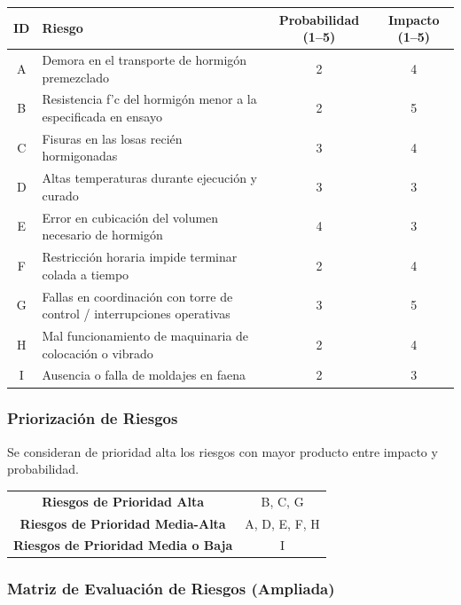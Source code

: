 \begin{center}
\begin{tabular}{|c|p{8.2cm}|c|c|}
\hline
\textbf{ID} & \textbf{Riesgo} & \textbf{Probabilidad (1–5)} & \textbf{Impacto (1–5)} \\
\hline
A & Demora en el transporte de hormigón premezclado & 2 & 4 \\
B & Resistencia f’c del hormigón menor a la especificada en ensayo & 2 & 5 \\
C & Fisuras en las losas recién hormigonadas & 3 & 4 \\
D & Altas temperaturas durante ejecución y curado & 3 & 3 \\
E & Error en cubicación del volumen necesario de hormigón & 4 & 3 \\
F & Restricción horaria impide terminar colada a tiempo & 2 & 4 \\
G & Fallas en coordinación con torre de control / interrupciones operativas & 3 & 5 \\
H & Mal funcionamiento de maquinaria de colocación o vibrado & 2 & 4 \\
I & Ausencia o falla de moldajes en faena & 2 & 3 \\
\hline
\end{tabular}
\end{center}

\vspace{0.3cm}

\subsubsection*{Priorización de Riesgos}

Se consideran de prioridad alta los riesgos con mayor producto entre impacto y probabilidad.

\begin{center}
\begin{tabular}{|c|c|}
\hline
\textbf{Riesgos de Prioridad Alta} & B, C, G \\
\textbf{Riesgos de Prioridad Media-Alta} & A, D, E, F, H \\
\textbf{Riesgos de Prioridad Media o Baja} & I \\
\hline
\end{tabular}
\end{center}

\vspace{0.3cm}

\subsubsection*{Matriz de Evaluación de Riesgos (Ampliada)}

